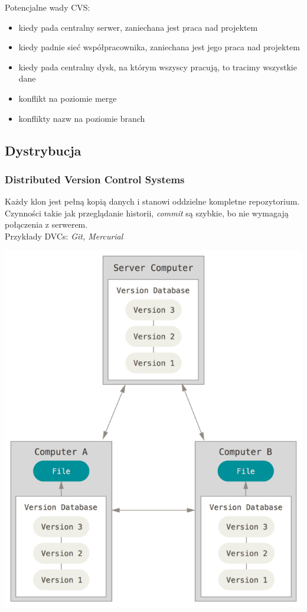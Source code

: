\documentclass{beamer}
\begin{document}
\begin{frame}
  Potencjalne wady CVS:\@
  \begin{itemize}
  \item kiedy pada centralny serwer, zaniechana jest praca nad projektem
  \item kiedy padnie sieć współpracownika, zaniechana jest jego praca nad projektem
  \item kiedy pada centralny dysk, na którym wszyscy pracują, to tracimy wszystkie dane 
  \item konflikt na poziomie merge
  \item konflikty nazw na poziomie branch
 \end{itemize}
\end{frame}

\subsection{Dystrybucja}
\begin{frame}
 \frametitle{\textbf{D}istributed \textbf{V}ersion \textbf{C}ontrol \textbf{S}ystems}
  Każdy klon jest pełną kopią danych i stanowi oddzielne kompletne repozytorium.\\
  Czynności takie jak przeglądanie historii, \textit{commit} są szybkie, bo nie wymagają połączenia z serwerem.
\\
 Przykłady DVCs: \textit{Git, Mercurial}
\end{frame}

\begin{frame}
  \begin{center}
   \includegraphics[height=0.7\textwidth]{./obrazki/fig-1_3.png}
 \end{center} 
\end{frame}
\end{document}
